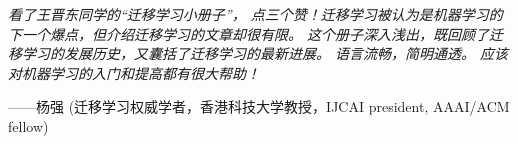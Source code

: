 \documentclass[a4paper]{article}
\begin{document}
\textit{看了王晋东同学的“迁移学习小册子”， 点三个赞！迁移学习被认为是机器学习的下一个爆点，但介绍迁移学习的文章却很有限。 这个册子深入浅出，既回顾了迁移学习的发展历史，又囊括了迁移学习的最新进展。 语言流畅，简明通透。 应该对机器学习的入门和提高都有很大帮助！}

——杨强 (迁移学习权威学者，香港科技大学教授，IJCAI president, AAAI/ACM fellow)

\newpage
\setcounter{page}{1}
\begingroup           
\begin{multicols}{2}[
	\setlength{\columnseprule}{.4pt}
	\setlength{\columnsep}{18pt}]
	\tableofcontents
\end{multicols}
\endgroup
\newpage























\end{document}
